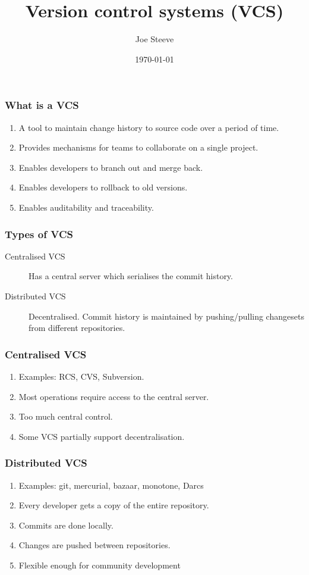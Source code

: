 \documentclass{beamer}
\title{Version control systems (VCS)}
\author{Joe Steeve}
\date{\today}
\begin{document}
\begin{frame}
  \titlepage
\end{frame}

\begin{frame}
  \frametitle{What is a VCS}
  \begin{enumerate}
  \item A tool to maintain change history to source code over a period
    of time.
  \item Provides mechanisms for teams to collaborate on a single
    project.
  \item Enables developers to branch out and merge back.
  \item Enables developers to rollback to old versions.
  \item Enables auditability and traceability.
  \end{enumerate}
\end{frame}

\begin{frame}
  \frametitle{Types of VCS}

  \begin{description}
  \item[Centralised VCS] Has a central server which serialises the
    commit history.
  \item[Distributed VCS] Decentralised. Commit history is maintained by
    pushing/pulling changesets from different repositories.
  \end{description}
\end{frame}


\begin{frame}
  \frametitle{Centralised VCS}

  \begin{enumerate}
  \item Examples: RCS, CVS, Subversion.
  \item Most operations require access to the central server.
  \item Too much central control.
  \item Some VCS partially support decentralisation.
  \end{enumerate}
\end{frame}

\begin{frame}
  \frametitle{Distributed VCS}
  \begin{enumerate}
  \item Examples: git, mercurial, bazaar, monotone, Darcs
  \item Every developer gets a copy of the entire repository.
  \item Commits are done locally.
  \item Changes are pushed between repositories.
  \item Flexible enough for community development
  \end{enumerate}
\end{frame}
\end{document}
